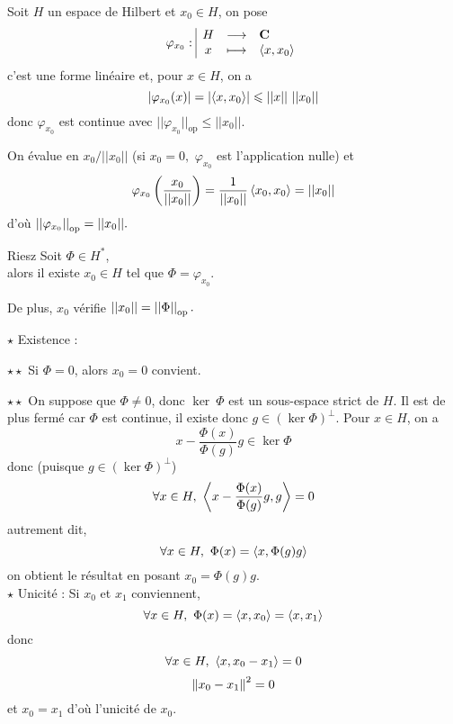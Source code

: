 \documentclass[a4paper,11pt, twoside]{article}
\begin{document}




Soit $H$ un espace de Hilbert et $x_0\in H$, on pose 
$$\varphi_{x_0}:\begin{array}{|ccl}
  H&\longrightarrow&\mathbf C\\
  x&\longmapsto&\left\langle x,x_0 \right\rangle
\end{array}$$
c'est une forme linéaire et, pour $x\in H$, on a 
$$\left| \varphi_{x_0}(x)\right|=\left| \left\langle x,x_0 \right\rangle\right|\leqslant ||x||\ ||x_0||$$
donc $\varphi_{x_0}$ est continue avec $||\varphi_{x_0}||_{\mathrm{op}}\leqslant ||x_0||.$

On évalue en $x_0/||x_0||$ (si $x_0=0,$ $\varphi_{x_0}$ est l'application nulle) et
$$\varphi_{x_0}\left(\frac{x_0}{||x_0||}\right)=\frac{1}{||x_0||}\left\langle x_0,x_0 \right\rangle=||x_0||$$
d'où $\left|\left|\varphi_{x_0}\right|\right|_{\mathrm{op}}=||x_0||.$


\begin{thC}{Riesz}
  Soit $\Phi\in H^*$,\\

   alors il existe $x_0\in H$ tel que $\Phi=\varphi_{x_0}.$
\end{thC}


\begin{RQ}
  De plus, $x_0$ vérifie $||x_0||=\left|\left|\Phi\right|\right|_{\mathrm{op}}.$
\end{RQ}


\begin{Proof}
  $\star$ Existence :

  $\star\star$ Si $\Phi=0$, alors $x_0=0$ convient.

  $\star\star$ On suppose que $\Phi\neq0$, donc $\ker\ \Phi$ est un sous-espace strict de $H$. Il est de plus fermé car $\Phi$ est continue, il existe donc $g\in \left(\ker\Phi\right)^\bot.$
  Pour $x\in H$, on a 
  $$x-\frac{\Phi(x)}{\Phi(g)}g\in\ker\Phi$$
  donc (puisque $g\in \left(\ker\Phi\right)^\bot$)
  $$\forall x\in H,\ \ps{x-\frac{\Phi(x)}{\Phi(g)}g,g}=0$$
  autrement dit, 
  $$\forall x\in H,\ \Phi(x)=\left\langle x,\Phi(g)g \right\rangle$$
  on obtient le résultat en posant $x_0=\Phi(g)g$.\\

  $\star$ Unicité :
  Si $x_0$ et $x_1$ conviennent, 
  $$\forall x\in H,\ \Phi(x)=\ps{x,x_0}=\ps{x,x_1}$$
  donc 
  $$\forall x\in H,\ \left\langle x,x_0-x_1 \right\rangle=0$$
  $$\left\lVert x_0-x_1\right\rVert^2=0$$
  et $x_0=x_1$ d'où l'unicité de $x_0.$
\end{Proof}
\end{document}
